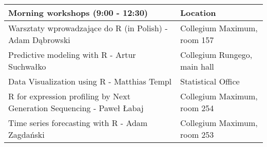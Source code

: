 \begingroup\fontsize{9pt}{10pt}\selectfont
\begin{longtable}{|p{8.2cm}|p{4.6cm}|}
  \hline
Morning workshops (9:00 - 12:30) & Location \\ 
  \hline
Warsztaty wprowadzające do R (in Polish) - Adam Dąbrowski & Collegium Maximum, room 157 \\ 
  Predictive modeling with R - Artur Suchwałko & Collegium Rungego, main hall \\ 
  Data Visualization using R - Matthias Templ & Statistical Office \\ 
  R for expression profiling by Next Generation Sequencing - Paweł Łabaj & Collegium Maximum, room 254 \\ 
  Time series forecasting with R - Adam Zagdański & Collegium Maximum, room 253 \\ 
   \hline
\end{longtable}
\endgroup
